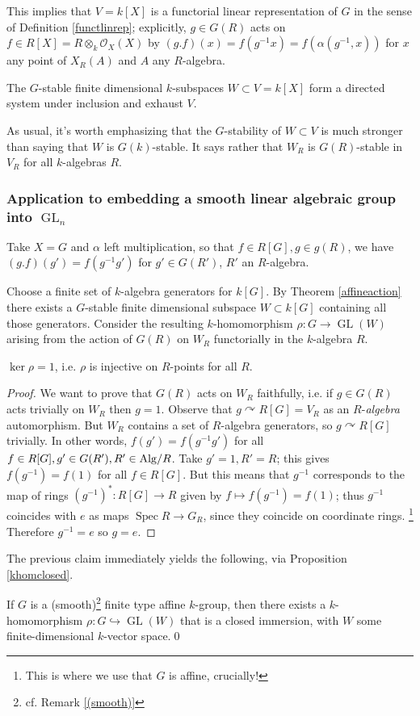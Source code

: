 \documentclass[10pt]{article}
\newcommand{\cO}{\mathcal{O}}
\newcommand{\GL}{\operatorname{GL}}
\renewcommand{\(}{\left(}
\renewcommand{\)}{\right)}
\newcommand{\actson}{\curvearrowright}
\newcommand{\Spec}{\operatorname{Spec}}
\newcommand{\into}{\hookrightarrow}
\newcommand{\dotimes}{\displaystyle\mathop{\otimes}}
\numberwithin{thm}{subsection}
\begin{document}
This implies that $V=k[X]$ is a functorial linear representation of $G$ in the sense of Definition \ref{functlinrep};
explicitly, $g\in G(R)$ acts on $f\in R[X]=R\dotimes_k\cO_X(X)$
by $(g.f)(x)=f(g^{-1}x)=f(\alpha(g^{-1},x))$ for $x$ any point of $X_R(A)$ and $A$
any $R$-algebra.

\begin{thm}\label{affineaction}
The $G$-stable finite dimensional $k$-subspaces $W\subset V=k[X]$ form
a directed system under inclusion and exhaust $V$.
\end{thm}
\begin{rem}As usual, it's worth emphasizing that the $G$-stability of $W\subset V$
is much stronger than saying that $W$ is $G(k)$-stable. It says
rather that $W_R$ is $G(R)$-stable in $V_R$ for all $k$-algebras $R$.
\end{rem}
\subsubsection{Application to embedding a smooth linear algebraic group into $\GL_n$}
Take $X=G$ and $\alpha$ left multiplication,
so that $f\in R[G],g\in g(R)$, we have $(g.f)(g')=f(g^{-1}g')$ for
$g'\in G(R')$, $R'$ an $R$-algebra.

Choose a finite set of $k$-algebra generators for $k[G]$.
By Theorem \ref{affineaction} there exists a $G$-stable finite dimensional
subspace $W\subset k[G]$ containing all those generators.
Consider the resulting $k$-homomorphism $\rho:G\to \GL(W)$
arising from the action of $G(R)$ on $W_R$ functorially in the $k$-algebra $R$.
\begin{claim}$\ker\rho=1$, i.e. $\rho$ is injective on $R$-points for all $R$.
\end{claim}
\begin{proof}
We want to prove that $G(R)$ acts on $W_R$ faithfully, i.e. 
if $g\in G(R)$ acts trivially on $W_R$ then $g=1$.
Observe that $g\actson R[G]=V_R$ as an $R$-\textit{algebra} automorphism.
But $W_R$ contains a set of $R$-algebra generators, so $g\actson R[G]$ trivially.
In other words, $f(g')=f(g^{-1}g')$ for all $f\in R[G],g'\in G(R'),R'\in {\rm{Alg}}/R$.
Take $g'=1,R'=R$;
this gives $f(g^{-1})=f(1)$ for all $f\in R[G]$.
But this means that $g^{-1}$ corresponds to the map of rings
$(g^{-1})^*:R[G]\to R$ given by $f\mapsto f(g^{-1})=f(1)$;
thus $g^{-1}$ coincides with $e$ as maps $\Spec R\to  G_R$,
since they coincide on coordinate rings. \footnote{This is where we use that
$G$ is affine, crucially!}
Therefore $g^{-1}=e$ so $g=e$.
\end{proof}
The previous claim immediately yields the following, via Proposition \ref{khomclosed}.
\begin{cor}\label{GLnembedding}
  If $G$ is a (smooth)\footnote{cf. Remark \ref{(smooth)}} finite type affine $k$-group,
then there exists a $k$-homomorphism $\rho:G\into \GL(W)$ 
that is a closed immersion, with $W$ some finite-dimensional $k$-vector space.\qed
\end{cor}
\end{document}
